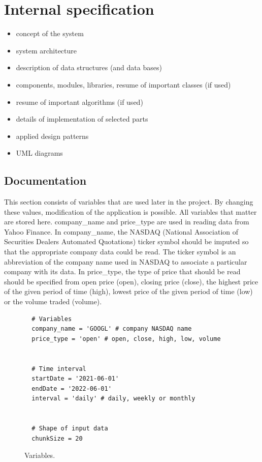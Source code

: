\chapter{Internal specification}

\begin{itemize}
\item concept of the system
\item system architecture
\item description of data structures (and data bases)
\item components, modules, libraries, resume of important classes (if used)
\item resume of important algorithms (if used)
\item details of implementation of selected parts
\item applied design patterns
\item UML diagrams
\end{itemize}

\section{Documentation}

This section consists of variables that are used later in the project. By changing these values, modification of the application is possible. All variables that matter are stored here. company{\_}name and price{\_}type are used in reading data from Yahoo Finance. In company{\_}name, the NASDAQ (National Association of Securities Dealers Automated Quotations) ticker symbol should be imputed so that the appropriate company data could be read. The ticker symbol is an abbreviation of the company name used in NASDAQ to associate a particular company with its data. In price{\_}type, the type of price that should be read should be specified from open price (open), closing price (close), the highest price of the given period of time (high), lowest price of the given period of time (low) or the volume traded (volume).

\clearpage
\begin{figure}
\centering
\begin{lstlisting}
  # Variables
  company_name = 'GOOGL' # company NASDAQ name
  price_type = 'open' # open, close, high, low, volume
  
  
  # Time interval
  startDate = '2021-06-01'
  endDate = '2022-06-01'
  interval = 'daily' # daily, weekly or monthly
  
  
  # Shape of input data
  chunkSize = 20
\end{lstlisting}
\caption{Variables.}
\label{fig:pseudocode:listings}
\end{figure}

